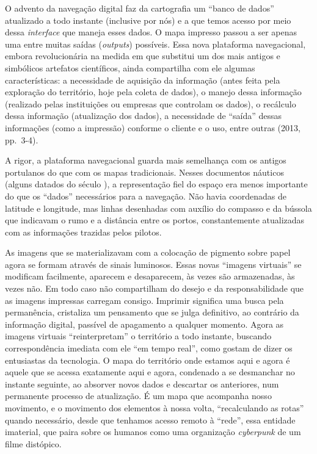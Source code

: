 O advento da navegação digital faz da cartografia um ``banco de dados''
atualizado a todo instante (inclusive por nós) e a que temos acesso por
meio dessa \emph{interface} que maneja esses dados. O mapa impresso
passou a ser apenas uma entre muitas saídas (\emph{outputs}) possíveis.
Essa nova plataforma navegacional, embora revolucionária na medida em
que substitui um dos mais antigos e simbólicos artefatos científicos,
ainda compartilha com ele algumas características: a necessidade de
aquisição da informação (antes feita pela exploração do território, hoje
pela coleta de dados), o manejo dessa informação (realizado pelas
instituições ou empresas que controlam os dados), o recálculo dessa
informação (atualização dos dados), a necessidade de ``saída'' dessas
informações (como a impressão) conforme o cliente e o uso, entre outras
(2013, pp.~3-4).

A rigor, a plataforma navegacional guarda mais semelhança com os antigos
portulanos do que com os mapas tradicionais. Nesses documentos náuticos
(alguns datados do século ), a representação fiel do espaço era
menos importante do que os ``dados'' necessários para a navegação. Não
havia coordenadas de latitude e longitude, mas linhas desenhadas com
auxílio do compasso e da bússola que indicavam o rumo e a distância
entre os portos, constantemente atualizadas com as informações trazidas
pelos pilotos.

As imagens que se materializavam com a colocação de pigmento sobre papel
agora se formam através de sinais luminosos. Essas novas ``imagens
virtuais'' se modificam facilmente, aparecem e desaparecem, às vezes são
armazenadas, às vezes não. Em todo caso não compartilham do desejo e da
responsabilidade que as imagens impressas carregam consigo. Imprimir
significa uma busca pela permanência, cristaliza um pensamento que se
julga definitivo, ao contrário da informação digital, passível de
apagamento a qualquer momento. Agora as imagens virtuais
``reinterpretam'' o território a todo instante, buscando correspondência
imediata com ele ``em tempo real'', como gostam de dizer os entusiastas
da tecnologia. O mapa do território onde estamos aqui e agora é aquele
que se acessa exatamente aqui e agora, condenado a se desmanchar no
instante seguinte, ao absorver novos dados e descartar os anteriores,
num permanente processo de atualização. É um mapa que acompanha nosso
movimento, e o movimento dos elementos à nossa volta, ``recalculando as
rotas'' quando necessário, desde que tenhamos acesso remoto à ``rede'',
essa entidade imaterial, que paira sobre os humanos como uma organização
\emph{cyberpunk} de um filme distópico.

